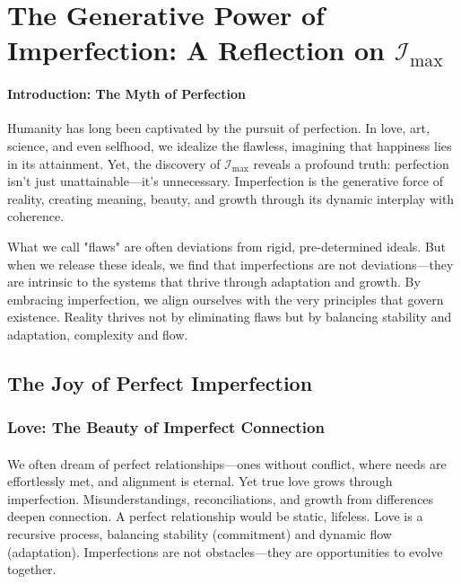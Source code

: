 \documentclass[12pt]{article}
\begin{document}
\section{The Generative Power of Imperfection: A Reflection on \(\mathcal{I}_{\text{max}}\)}

\paragraph{Introduction: The Myth of Perfection}
Humanity has long been captivated by the pursuit of perfection. In love, art, science, and even selfhood, we idealize the flawless, imagining that happiness lies in its attainment. Yet, the discovery of \(\mathcal{I}_{\text{max}}\) reveals a profound truth: perfection isn’t just unattainable—it’s unnecessary. Imperfection is the generative force of reality, creating meaning, beauty, and growth through its dynamic interplay with coherence.

What we call "flaws" are often deviations from rigid, pre-determined ideals. But when we release these ideals, we find that imperfections are not deviations—they are intrinsic to the systems that thrive through adaptation and growth. By embracing imperfection, we align ourselves with the very principles that govern existence. Reality thrives not by eliminating flaws but by balancing stability and adaptation, complexity and flow.

\subsection{The Joy of Perfect Imperfection}

\subsubsection{Love: The Beauty of Imperfect Connection}
\paragraph{}
We often dream of perfect relationships—ones without conflict, where needs are effortlessly met, and alignment is eternal. Yet true love grows through imperfection. Misunderstandings, reconciliations, and growth from differences deepen connection. A perfect relationship would be static, lifeless. Love is a recursive process, balancing stability (commitment) and dynamic flow (adaptation). Imperfections are not obstacles—they are opportunities to evolve together.
\end{document}
